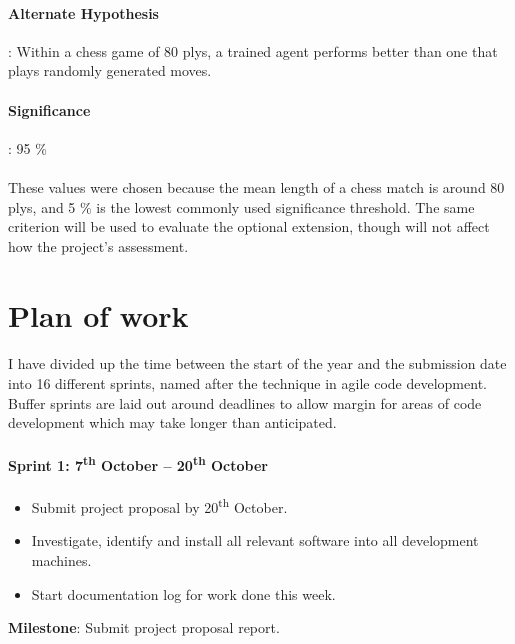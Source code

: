 \documentclass[a4paper]{article}
\begin{document}
\paragraph{Alternate Hypothesis}: Within a chess game of 80 plys, a trained agent performs better than one that plays randomly generated moves.

\paragraph{Significance}: 95 \%

\paragraph{}These values were chosen because the mean length of a chess match is around 80 plys, and 5 \% is the lowest commonly used significance threshold. The same criterion will be used to evaluate the optional extension, though will not affect how the project's assessment.


\section*{Plan of work}

\paragraph{} I have divided up the time between the start of the year and the submission date into 16 different sprints, named after the technique in agile code development. Buffer sprints are laid out around deadlines to allow margin for areas of code development which may take longer than anticipated.

\paragraph{Sprint 1: 7\textsuperscript{th} October -- 20\textsuperscript{th} October}
\begin{itemize}
\item Submit project proposal by 20\textsuperscript{th} October.
\item Investigate, identify and install all relevant software into all development machines.
\item Start documentation log for work done this week.
\end{itemize}

\textbf{Milestone}: Submit project proposal report.
\end{document}
